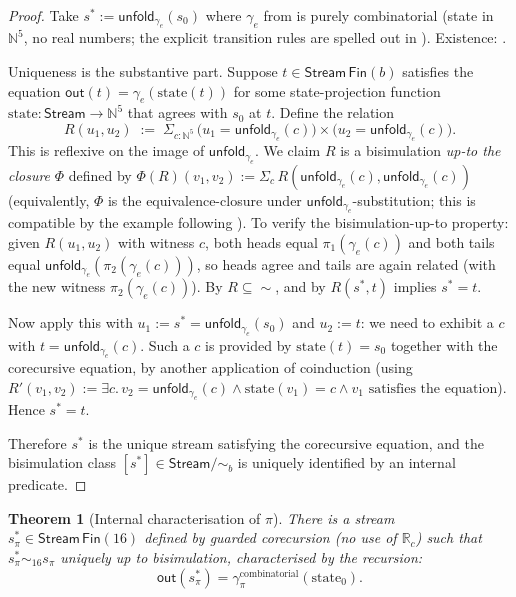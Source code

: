 \documentclass[12pt]{article}
\newtheorem{theorem}{Theorem}[section]
\theoremstyle{definition}
\theoremstyle{remark}
\newcommand{\N}{\mathbb{N}}
\newcommand{\R}{\mathbb{R}}
\newcommand{\Rc}{\R_c}
\newcommand{\Stream}{\mathsf{Stream}}
\newcommand{\out}{\mathsf{out}}
\newcommand{\unfold}{\mathsf{unfold}}
\newcommand{\bisim}{\mathrel{\sim}}
\begin{document}
\begin{proof}
Take $s^* := \unfold_{\gamma_e}(s_0)$ where $\gamma_e$ from
 is purely combinatorial (state in $\N^5$, no
real numbers; the explicit transition rules are spelled out in
). Existence: .

Uniqueness is the substantive part. Suppose $t \in \Stream\,\mathsf{Fin}(b)$
satisfies the equation $\out(t) = \gamma_e(\mathrm{state}(t))$ for some
state-projection function $\mathrm{state}: \Stream \to \N^5$ that
agrees with $s_0$ at $t$. Define the relation
\[
R(u_1, u_2) \;:=\; \Sigma_{c:\N^5}\,
  \bigl( u_1 = \unfold_{\gamma_e}(c) \bigr)\times
  \bigl( u_2 = \unfold_{\gamma_e}(c) \bigr).
\]
This is reflexive on the image of $\unfold_{\gamma_e}$. We claim
$R$ is a bisimulation \emph{up-to the closure} $\Phi$ defined by
$\Phi(R)(v_1,v_2) := \Sigma_{c}\,R(\unfold_{\gamma_e}(c),\unfold_{\gamma_e}(c))$
(equivalently, $\Phi$ is the equivalence-closure under
$\unfold_{\gamma_e}$-substitution; this is compatible by the
example following ). To verify
the bisimulation-up-to property: given $R(u_1,u_2)$ with witness
$c$, both heads equal $\pi_1(\gamma_e(c))$ and both tails
equal $\unfold_{\gamma_e}(\pi_2(\gamma_e(c)))$, so heads agree
and tails are again related (with the new witness
$\pi_2(\gamma_e(c))$). By  $R \subseteq \bisim$,
and by  $R(s^*, t)$ implies $s^* = t$.

Now apply this with $u_1 := s^* = \unfold_{\gamma_e}(s_0)$ and
$u_2 := t$: we need to exhibit a $c$ with $t = \unfold_{\gamma_e}(c)$.
Such a $c$ is provided by $\mathrm{state}(t) = s_0$ together with
the corecursive equation, by another application of coinduction
(using $R'(v_1,v_2) := \exists c.\,v_2 = \unfold_{\gamma_e}(c)\wedge
\mathrm{state}(v_1) = c\wedge v_1\text{ satisfies the equation}$).
Hence $s^* = t$.

Therefore $s^*$ is the unique stream satisfying the corecursive
equation, and the bisimulation class
$[s^*] \in \Stream/{\bisim_b}$ is uniquely identified by an
internal predicate.
\end{proof}

\begin{theorem}[Internal characterisation of $\pi$]\label{thm:pi-internal}
There is a stream $s^*_\pi \in \Stream\,\mathsf{Fin}(16)$
defined by guarded corecursion (no use of $\Rc$) such that
$s^*_\pi \bisim_{16} s_\pi$ uniquely up to bisimulation,
characterised by the recursion:
\[
\out(s^*_\pi) = \gamma_\pi^{\text{combinatorial}}(\mathrm{state}_0).
\]
\end{theorem}
\end{document}
